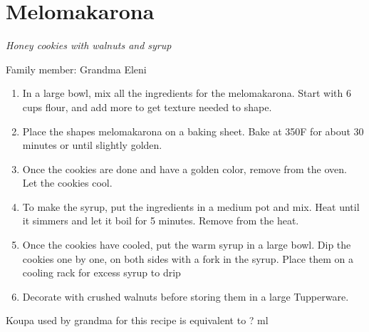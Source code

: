 \chapter{Melomakarona}
\label{ch:melomakarona}


\textit{Honey cookies with walnuts and syrup}

Family member: Grandma Eleni

\begin{enumerate}
    \item In a large bowl, mix all the ingredients for the melomakarona. Start with 6 cups flour, and add more to get texture needed to shape.
    \item Place the shapes melomakarona on a baking sheet. Bake at 350\degree F for about 30 minutes or until slightly golden.
    \item Once the cookies are done and have a golden color, remove from the oven. Let the cookies cool. 
    \item To make the syrup, put the ingredients in a medium pot and mix. Heat until it simmers and let it boil for 5 minutes. Remove from the heat.
    \item Once the cookies have cooled, put the warm syrup in a large bowl. Dip the cookies one by one, on both sides with a fork in the syrup. Place them on a cooling rack for excess syrup to drip
    \item Decorate with crushed walnuts before storing them in a large Tupperware.
\end{enumerate}

Koupa used by grandma for this recipe is equivalent to ? ml
